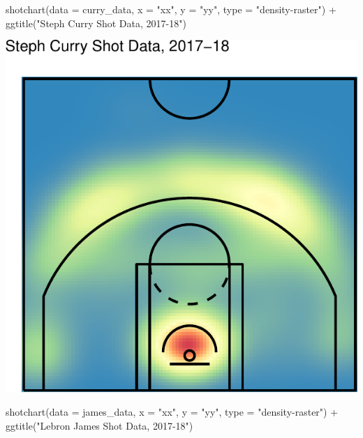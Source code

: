 \documentclass[
  11pt,
]{book}
\newenvironment{Shaded}{\begin{snugshade}}{\end{snugshade}}
\newcommand{\AttributeTok}[1]{\textcolor[rgb]{0.77,0.63,0.00}{#1}}
\newcommand{\FunctionTok}[1]{\textcolor[rgb]{0.00,0.00,0.00}{#1}}
\newcommand{\NormalTok}[1]{#1}
\newcommand{\SpecialCharTok}[1]{\textcolor[rgb]{0.00,0.00,0.00}{#1}}
\newcommand{\StringTok}[1]{\textcolor[rgb]{0.31,0.60,0.02}{#1}}
\theoremstyle{definition}
\theoremstyle{definition}
\theoremstyle{definition}
\theoremstyle{definition}
\theoremstyle{remark}
\begin{document}
\begin{Shaded}
\begin{Highlighting}[]
\FunctionTok{shotchart}\NormalTok{(}\AttributeTok{data =}\NormalTok{ curry\_data, }\AttributeTok{x =} \StringTok{"xx"}\NormalTok{, }\AttributeTok{y =} \StringTok{"yy"}\NormalTok{, }\AttributeTok{type =} \StringTok{"density{-}raster"}\NormalTok{) }\SpecialCharTok{+} \FunctionTok{ggtitle}\NormalTok{(}\StringTok{"Steph Curry Shot Data, 2017{-}18"}\NormalTok{)}
\end{Highlighting}
\end{Shaded}

\includegraphics{series_files/figure-latex/basketballanalyzer 7-2.pdf}

\begin{Shaded}
\begin{Highlighting}[]
\FunctionTok{shotchart}\NormalTok{(}\AttributeTok{data =}\NormalTok{ james\_data, }\AttributeTok{x =} \StringTok{"xx"}\NormalTok{, }\AttributeTok{y =} \StringTok{"yy"}\NormalTok{, }\AttributeTok{type =} \StringTok{"density{-}raster"}\NormalTok{) }\SpecialCharTok{+} \FunctionTok{ggtitle}\NormalTok{(}\StringTok{"Lebron James Shot Data, 2017{-}18"}\NormalTok{)}
\end{Highlighting}
\end{Shaded}
\end{document}
